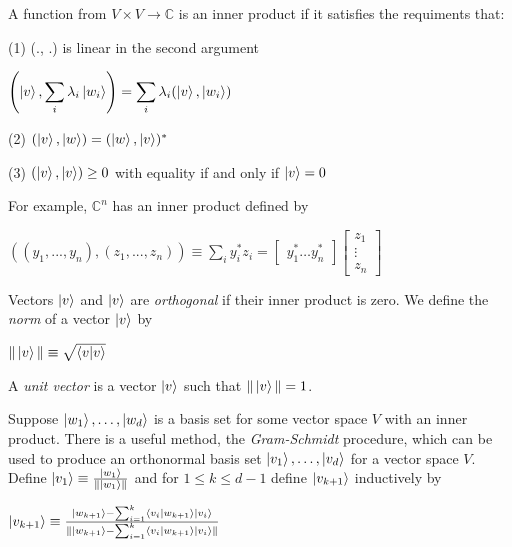 \documentclass{article}
\begin{document}
A function from $V \times V \rightarrow \mathbb{C}$ is an inner product if it
satisfies the requiments that:

(1) (., .) is linear in the second argument
  \begin{center}
    $
      \left(\ket{v}, \displaystyle\sum_{i}\lambda_{i}\ket{w_{i}}\right) = 
      \displaystyle\sum_{i}\lambda_{i}(\ket{v}, \ket{w_{i}})
    $
  \end{center}

(2) $(\ket{v}, \ket{w}) = (\ket{w}, \ket{v})^{*}$

(3) $(\ket{v}, \ket{v}) \geq 0$ with equality if and only if $\ket{v} = 0$

For example, $\mathbb{C}^{n}$ has an inner product defined by
  \begin{center}
    $
      ((y_{1},...,y_{n}),(z_{1},...,z_{n})) \equiv
      \displaystyle\sum_{i}y_{i}^{*}z_{i} =
      \begin{bmatrix}
      y_{1}^{*} \hdots y_{n}^{*}
      \end{bmatrix}
      \begin{bmatrix}
      z_{1} \\
      \vdots \\
      z_{n}
      \end{bmatrix}
    $
  \end{center}

Vectors $\ket{v}$ and $\ket{v}$ are \emph{orthogonal} if their inner product
is zero. We define the \emph{norm} of a vector $\ket{v}$ by
  \begin{center}
    $\|\ket{v}\| \equiv \sqrt{\bra{v}\ket{v}}$
  \end{center}

A \emph{unit vector} is a vector $\ket{v}$ such that $\|\ket{v}\| = 1$.

Suppose $\ket{w_{1}},\hdots,\ket{w_{d}}$ is a basis set for some vector space
$V$ with an inner product. There is a useful method, the \emph{Gram-Schmidt}
procedure, which can be used to produce an orthonormal basis set
$\ket{v_{1}},\hdots,\ket{v_{d}}$ for a vector space $V$. Define
$\ket{v_{1}} \equiv \frac{\ket{w_{1}}}{\|\ket{w_{1}}\|}$ and for
$1 \leq k \leq d-1$ define $\ket{v_{k+1}}$ inductively by
  \begin{center}
  $
    \ket{v_{k+1}} \equiv
    \frac{\ket{w_{k+1}} - \sum_{i=1}^{k}\bra{v_{i}}\ket{w_{k+1}}\ket{v_{i}}}{
    \|\ket{w_{k+1}} - \sum_{i=1}^{k}\bra{v_{i}}\ket{w_{k+1}}\ket{v_{i}}\|}
  $
  \end{center}
\end{document}
